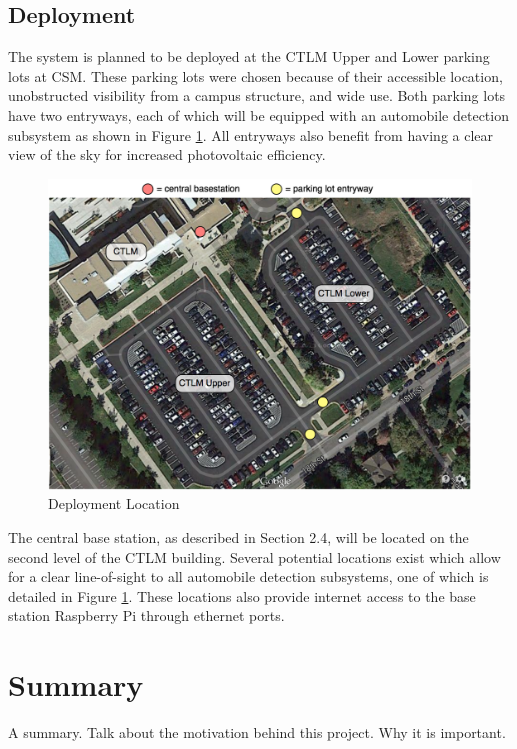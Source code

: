 \documentclass[11pt, oneside, fullpage, doublespace]{article}
\begin{document}
\subsection{Deployment}
The system is planned to be deployed at the CTLM Upper and Lower parking lots at CSM. These parking lots were chosen because of their accessible location, unobstructed visibility from a campus structure, and wide use. Both parking lots have two entryways, each of which will be equipped with an automobile detection subsystem as shown in Figure \ref{fig:deployment}. All entryways also benefit from having a clear view of the sky for increased photovoltaic efficiency.

\begin{figure}
\begin{center}
\includegraphics[width=5in]{deployment}
\end{center}
\caption{Deployment Location}
\label{fig:deployment}
\end{figure}

The central base station, as described in Section 2.4, will be located on the second level of the CTLM building. Several potential locations exist which allow for a clear line-of-sight to all automobile detection subsystems, one of which is detailed in Figure \ref{fig:deployment}. These locations also provide internet access to the base station Raspberry Pi through ethernet ports.


\section{Summary}
A summary. Talk about the motivation behind this project. Why it is important.
\end{document}
